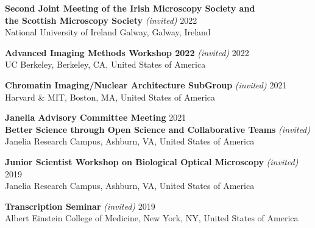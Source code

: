 \documentclass[margin,line]{res}
\begin{document}
\begin{resume}
\vspace*{-2.5mm}
{\bf  Second Joint Meeting of the Irish Microscopy Society and \\the Scottish Microscopy Society}  {\it (invited)} \hfill 2022\\
National University of Ireland Galway, Galway, Ireland %

\vspace*{-2.5mm}
{\bf  Advanced Imaging Methods Workshop 2022}  {\it (invited)} \hfill 2022\\
UC Berkeley, Berkeley, CA, United States of America %

\vspace*{-2.5mm}
{\bf  Chromatin Imaging/Nuclear Architecture SubGroup}  {\it (invited)} \hfill 2021\\
Harvard \& MIT, Boston, MA, United States of America %

\vspace*{-2.5mm}
{\bf  Janelia Advisory Committee Meeting}  \hfill 2021\\
{\bf Better Science through Open Science and Collaborative Teams}  {\it (invited)} \\
Janelia Research Campus, Ashburn, VA, United States of America %

\vspace*{-2.5mm}
{\bf  Junior Scientist Workshop on Biological Optical Microscopy} {\it (invited)}  \hfill 2019\\
Janelia Research Campus, Ashburn, VA, United States of America %

\vspace*{-2.5mm}
{\bf  Transcription Seminar} {\it (invited)}  \hfill 2019\\
Albert Einstein College of Medicine, New York, NY, United States of America%


\end{resume}
\end{document}
